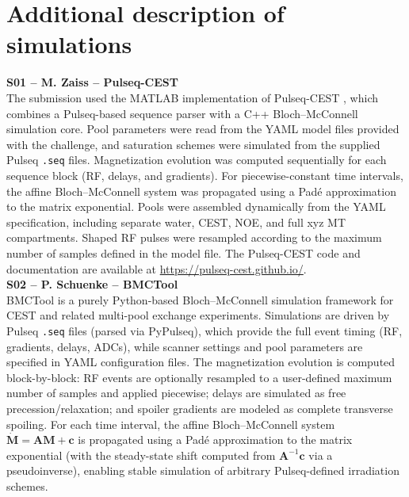 \documentclass[11pt,a4paper]{article}
\begin{document}
\section{Additional description of simulations}\label{si:simulations}

\noindent\textbf{S01 -- M. Zaiss -- Pulseq-CEST}\\
The submission used the MATLAB implementation of Pulseq-CEST \cite{Herz2021}, which combines a Pulseq-based sequence parser with a C++ Bloch--McConnell simulation core. Pool parameters were read from the YAML model files provided with the challenge, and saturation schemes were simulated from the supplied Pulseq \verb|.seq| files. Magnetization evolution was computed sequentially for each sequence block (RF, delays, and gradients). For piecewise-constant time intervals, the affine Bloch--McConnell system was propagated using a Pad\'e approximation to the matrix exponential. Pools were assembled dynamically from the YAML specification, including separate water, CEST, NOE, and full xyz MT compartments. Shaped RF pulses were resampled according to the maximum number of samples defined in the model file. The Pulseq-CEST code and documentation are available at \url{https://pulseq-cest.github.io/}.\\

\noindent\textbf{S02 -- P. Schuenke -- BMCTool}\\
BMCTool is a purely Python-based Bloch--McConnell simulation framework for CEST and related multi-pool exchange experiments. Simulations are driven by Pulseq \verb|.seq| files (parsed via PyPulseq), which provide the full event timing (RF, gradients, delays, ADCs), while scanner settings and pool parameters are specified in YAML configuration files. The magnetization evolution is computed block-by-block: RF events are optionally resampled to a user-defined maximum number of samples and applied piecewise; delays are simulated as free precession/relaxation; and spoiler gradients are modeled as complete transverse spoiling. For each time interval, the affine Bloch--McConnell system $\dot{\mathbf{M}}=\mathbf{A}\mathbf{M}+\mathbf{c}$ is propagated using a Pad\'e approximation to the matrix exponential (with the steady-state shift computed from $\mathbf{A}^{-1}\mathbf{c}$ via a pseudoinverse), enabling stable simulation of arbitrary Pulseq-defined irradiation schemes.\\
\end{document}
